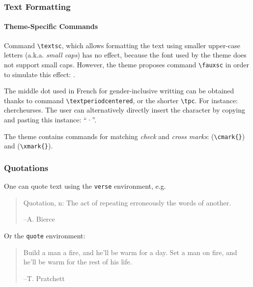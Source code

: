 \documentclass[10pt,    %
    english,            %
    xcolor=table,       %
    envcountsect,       %
    aspectratio=43      %
]{beamer}
\begin{document}
\begin{frame}
    \frametitle{Text Formatting} 
    \framesubtitle{Theme-Specific Commands} 
    
    Command \texttt{\textbackslash{}textsc}, which allows formatting the text using smaller upper-case letters (a.k.a. \textit{small caps}) has no effect, because the font used by the theme does not support small caps. However, the theme proposes command \texttt{\textbackslash{}fauxsc} in order to simulate this effect: .
    
    \vspace{0.25cm}
    The middle dot used in French for gender-inclusive writting can be obtained thanks to command \texttt{\textbackslash{}textperiodcentered}, or the shorter \texttt{\textbackslash{}tpc}. For instance: chercheur\textperiodcentered{}se\tpc{}s. The user can alternatively directly insert the character by copying and pasting this instance: ``·''.

    \vspace{0.25cm}
    The theme contains commands for matching \textit{check} and \textit{cross marks}: \cmark{} (\texttt{\textbackslash{}cmark\{\}}) and \xmark{} (\texttt{\textbackslash{}xmark\{\}}).
\end{frame}
    
\begin{frame}
    \frametitle{Quotations}
    
    One can quote text using the \texttt{verse} environment, e.g.
    \begin{verse}
        Quotation, n: The act of repeating erroneously the words of another. \\ 
        \vspace{-0.5cm}
        \begin{flushright}--A. Bierce\end{flushright}
    \end{verse}
    
    Or the \texttt{quote} environment:
    \begin{quote}
        Build a man a fire, and he'll be warm for a day. Set a man on fire, and he'll be warm for the rest of his life. \\ 
        \begin{flushright}--T. Pratchett\end{flushright}
    \end{quote}
\end{frame}
    
\end{document}
